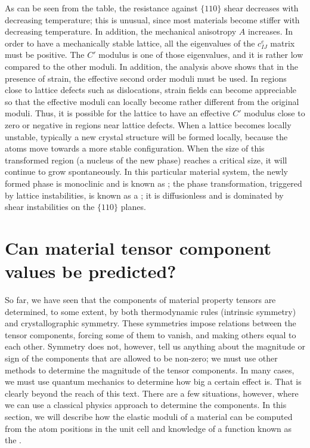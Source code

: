 As can be seen from the table, the resistance against $\{110\}$ shear decreases with decreasing temperature; this is unusual, since most materials become stiffer with decreasing temperature.  In addition, the mechanical anisotropy $A$ increases. In order to have a mechanically stable lattice, all the eigenvalues of the $c^e_{IJ}$ matrix must be positive.  The $C'$ modulus is one of those eigenvalues, and it is rather low compared to the other moduli. In addition, the analysis above shows that in the presence of strain, the effective second order moduli must be used. In regions close to lattice defects such as dislocations, strain fields can become appreciable so that the effective moduli can locally become rather different from the original moduli. Thus, it is possible for the lattice to have an effective $C'$ modulus close to zero or negative in regions near lattice defects. When a lattice becomes locally unstable, typically a new crystal structure will be formed locally, because the atoms move towards a more stable configuration. When the size of this transformed region (a nucleus of the new phase) reaches a critical size, it will continue to grow spontaneously.  In this particular material system, the newly formed phase is monoclinic and is known as ; the phase transformation, triggered by lattice instabilities, is known as a ; it is diffusionless and is dominated by shear instabilities on the $\{110\}$ planes.

\section{Can material tensor component values be predicted?}\label{\chabbr:sec:atomistic}

So far, we have seen that the components of material property tensors are determined, to some extent, by both thermodynamic rules (intrinsic symmetry) and crystallographic symmetry.  These symmetries impose relations between the tensor components, forcing some of them to vanish, and making others equal to each other. Symmetry does not, however, tell us anything about the magnitude or sign of the components that are allowed to be non-zero; we must use other methods to determine the magnitude of the tensor components.  In many cases, we must use quantum mechanics to determine how big a  certain effect is.  That is clearly beyond the reach of this text.  There are a few situations, however, where we can use a classical physics approach to determine the components.  In this section, we will describe how the elastic moduli of a material can be computed from the atom positions in the unit cell and knowledge of a function known as the .

